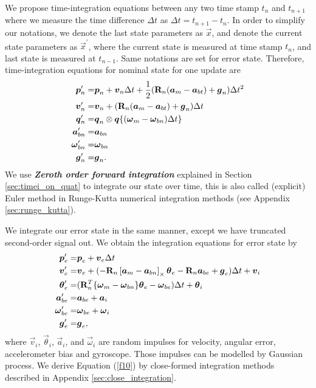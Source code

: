 We propose time-integration equations between any two time stamp $t_n$ and $t_{n+1}$ where we measure the time difference $\Delta{t}$ as $\Delta{t} = t_{n+1} - t_{n}$. In order to simplify our notations, we denote the last state parameters as $\vec{x}$, and denote the current state parameters as $\vec{x}^{\prime}$, where the current state is measured at time stamp $t_{n}$, and last state is measured at $t_{n-1}$. Same notations are set for error state. Therefore, time-integration equations for nominal state for one update are
\begin{align}
	\label{f112}
	\boldsymbol{p}_n^{\prime} =& \boldsymbol{p}_n + \boldsymbol{v}_n\Delta{t} + \frac{1}{2}(\mathbf{R}_n(\boldsymbol{a}_m - \boldsymbol{a}_{bt}) + \boldsymbol{g}_n)\Delta{t}^2 \\
	\boldsymbol{v}_n^{\prime} =& \boldsymbol{v}_n + (\mathbf{R}_n(\boldsymbol{a}_m - \boldsymbol{a}_{bt}) + \boldsymbol{g}_n)\Delta{t}\\
	\label{f9}
	\boldsymbol{q}_n^{\prime} =& \boldsymbol{q}_n \otimes \boldsymbol{q}\{(\boldsymbol{\omega}_m - \boldsymbol{\omega}_{bn})\Delta{t}\}\\
	\boldsymbol{a}_{bn}^{\prime} =& \boldsymbol{a}_{bn} \\
	\boldsymbol{\omega}_{bn}^{\prime} =& \boldsymbol{\omega}_{bn} \\ 
	\label{f113}
	\boldsymbol{g}_n^{\prime} =& \boldsymbol{g}_n.
\end{align}
We use \textbf{\textit{Zeroth order forward integration}} explained in Section \ref{sec:timei_on_quat} to integrate our state over time, this is also called (explicit) Euler method in Runge-Kutta numerical integration methods (see Appendix \ref{sec:runge_kutta}).

We integrate our error state in the same manner, except we have truncated second-order signal out. We obtain the integration equations for error state by
\begin{align}
	\boldsymbol{p}_e^{\prime} =& \boldsymbol{p}_e + \boldsymbol{v}_e \Delta{t}\\
	\boldsymbol{v}_e^{\prime} =& \boldsymbol{v}_e + (-\mathbf{R}_n \left[ \boldsymbol{a}_m - \boldsymbol{a}_{bn} \right]_{\times}\boldsymbol{\theta}_e -  \mathbf{R}_n\boldsymbol{a}_{be} + \boldsymbol{g}_e)\Delta{t} + \boldsymbol{v}_i\\
	\label{f10}
	\boldsymbol{\theta}_e^{\prime} =& (\mathbf{R}_n^T \{ \boldsymbol{\omega}_m - \boldsymbol{\omega}_{bn} \} \boldsymbol{\theta}_e - \boldsymbol{\omega}_{be})\Delta{t} + \boldsymbol{\theta}_{i}\\
	\boldsymbol{a}_{be}^{\prime} =& \boldsymbol{a}_{be} + \boldsymbol{a}_i\\
	\boldsymbol{\omega}_{be}^{\prime} =& \boldsymbol{\omega}_{be} + \boldsymbol{\omega}_i\\ 
	\label{f114}
	\boldsymbol{g}_e^{\prime} =& \boldsymbol{g}_e,
\end{align}
where $\vec{v}_i$, $\vec{\theta}_{i}$, $\vec{a}_i$, and $\vec{\omega}_i$ are random impulses for velocity, angular error, accelerometer bias and gyroscope. Those impulses can be modelled by Gaussian process. We derive Equation (\ref{f10}) by close-formed integration methods described in Appendix \ref{sec:close_integration}.

